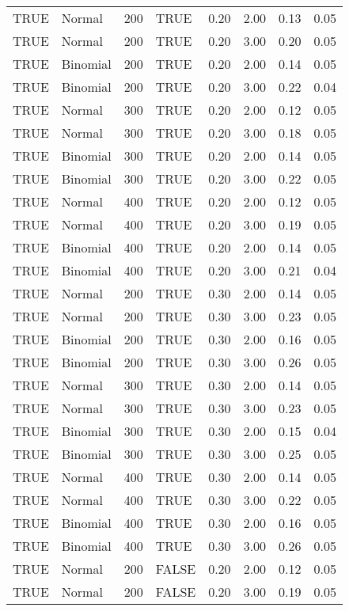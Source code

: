 \begin{longtable}{llrlrrrr}
  TRUE & Normal & 200 & TRUE & 0.20 & 2.00 & 0.13 & 0.05 \\ 
  TRUE & Normal & 200 & TRUE & 0.20 & 3.00 & 0.20 & 0.05 \\ 
  TRUE & Binomial & 200 & TRUE & 0.20 & 2.00 & 0.14 & 0.05 \\ 
  TRUE & Binomial & 200 & TRUE & 0.20 & 3.00 & 0.22 & 0.04 \\ 
  TRUE & Normal & 300 & TRUE & 0.20 & 2.00 & 0.12 & 0.05 \\ 
  TRUE & Normal & 300 & TRUE & 0.20 & 3.00 & 0.18 & 0.05 \\ 
  TRUE & Binomial & 300 & TRUE & 0.20 & 2.00 & 0.14 & 0.05 \\ 
  TRUE & Binomial & 300 & TRUE & 0.20 & 3.00 & 0.22 & 0.05 \\ 
  TRUE & Normal & 400 & TRUE & 0.20 & 2.00 & 0.12 & 0.05 \\ 
  TRUE & Normal & 400 & TRUE & 0.20 & 3.00 & 0.19 & 0.05 \\ 
  TRUE & Binomial & 400 & TRUE & 0.20 & 2.00 & 0.14 & 0.05 \\ 
  TRUE & Binomial & 400 & TRUE & 0.20 & 3.00 & 0.21 & 0.04 \\ 
  TRUE & Normal & 200 & TRUE & 0.30 & 2.00 & 0.14 & 0.05 \\ 
  TRUE & Normal & 200 & TRUE & 0.30 & 3.00 & 0.23 & 0.05 \\ 
  TRUE & Binomial & 200 & TRUE & 0.30 & 2.00 & 0.16 & 0.05 \\ 
  TRUE & Binomial & 200 & TRUE & 0.30 & 3.00 & 0.26 & 0.05 \\ 
  TRUE & Normal & 300 & TRUE & 0.30 & 2.00 & 0.14 & 0.05 \\ 
  TRUE & Normal & 300 & TRUE & 0.30 & 3.00 & 0.23 & 0.05 \\ 
  TRUE & Binomial & 300 & TRUE & 0.30 & 2.00 & 0.15 & 0.04 \\ 
  TRUE & Binomial & 300 & TRUE & 0.30 & 3.00 & 0.25 & 0.05 \\ 
  TRUE & Normal & 400 & TRUE & 0.30 & 2.00 & 0.14 & 0.05 \\ 
  TRUE & Normal & 400 & TRUE & 0.30 & 3.00 & 0.22 & 0.05 \\ 
  TRUE & Binomial & 400 & TRUE & 0.30 & 2.00 & 0.16 & 0.05 \\ 
  TRUE & Binomial & 400 & TRUE & 0.30 & 3.00 & 0.26 & 0.05 \\ 
  TRUE & Normal & 200 & FALSE & 0.20 & 2.00 & 0.12 & 0.05 \\ 
  TRUE & Normal & 200 & FALSE & 0.20 & 3.00 & 0.19 & 0.05 \\ 

\end{longtable}
